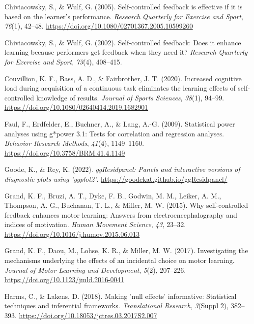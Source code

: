 \documentclass[
  man, donotrepeattitle,floatsintext]{apa7}
\newlength{\cslhangindent}
\newlength{\cslentryspacingunit} %
\newenvironment{CSLReferences}[2] %
 {%
  \setlength{\parindent}{0pt}
  \ifodd #1
  \let\oldpar\par
  \def\par{\hangindent=\cslhangindent\oldpar}
  \fi
  \setlength{\parskip}{#2\cslentryspacingunit}
 }%
 {}
\begin{document}
\begin{CSLReferences}{1}{0}
\leavevmode{}%
Chiviacowsky, S., \& Wulf, G. (2005). Self-controlled feedback is effective if it is based on the learner's performance. \emph{Research Quarterly for Exercise and Sport}, \emph{76}(1), 42--48. \url{https://doi.org/10.1080/02701367.2005.10599260}

\leavevmode{}%
Chiviacowsky, S., \& Wulf, G. (2002). Self-controlled feedback: Does it enhance learning because performers get feedback when they need it? \emph{Research Quarterly for Exercise and Sport}, \emph{73}(4), 408--415.

\leavevmode{}%
Couvillion, K. F., Bass, A. D., \& Fairbrother, J. T. (2020). Increased cognitive load during acquisition of a continuous task eliminates the learning effects of self-controlled knowledge of results. \emph{Journal of Sports Sciences}, \emph{38}(1), 94--99. \url{https://doi.org/10.1080/02640414.2019.1682901}

\leavevmode{}%
Faul, F., Erdfelder, E., Buchner, A., \& Lang, A.-G. (2009). Statistical power analyses using g*power 3.1: Tests for correlation and regression analyses. \emph{Behavior Research Methods}, \emph{41}(4), 1149--1160. \url{https://doi.org/10.3758/BRM.41.4.1149}

\leavevmode{}%
Goode, K., \& Rey, K. (2022). \emph{ggResidpanel: Panels and interactive versions of diagnostic plots using 'ggplot2'}. \url{https://goodekat.github.io/ggResidpanel/}

\leavevmode{}%
Grand, K. F., Bruzi, A. T., Dyke, F. B., Godwin, M. M., Leiker, A. M., Thompson, A. G., Buchanan, T. L., \& Miller, M. W. (2015). Why self-controlled feedback enhances motor learning: {Answers} from electroencephalography and indices of motivation. \emph{Human Movement Science}, \emph{43}, 23--32. \url{https://doi.org/10.1016/j.humov.2015.06.013}

\leavevmode{}%
Grand, K. F., Daou, M., Lohse, K. R., \& Miller, M. W. (2017). Investigating the mechanisms underlying the effects of an incidental choice on motor learning. \emph{Journal of Motor Learning and Development}, \emph{5}(2), 207--226. \url{https://doi.org/10.1123/jmld.2016-0041}

\leavevmode{}%
Harms, C., \& Lakens, D. (2018). Making 'null effects' informative: Statistical techniques and inferential frameworks. \emph{Translational Research}, \emph{3}(Suppl 2), 382--393. \url{https://doi.org/10.18053/jctres.03.2017S2.007}


\end{CSLReferences}
\end{document}
